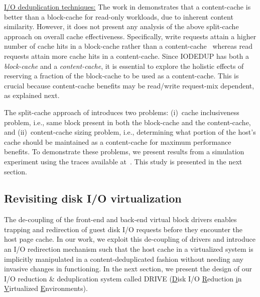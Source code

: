 \underline{I/O deduplication techniques:}
The work in \cite{iodedup} demonstrates that a 
content-cache 
is better than a block-cache for read-only workloads,
due to inherent content similarity.
However, it does not present any analysis of the above
split-cache approach on overall cache effectiveness.
Specifically,
write requests attain a higher number of cache hits in a block-cache rather
than a content-cache~\cite{iodedup} whereas read requests attain more 
cache hits in a content-cache. 
Since IODEDUP has both 
a \textit{block-cache} and a \textit{content-cache}, 
it is essential to explore the holistic effects of reserving a fraction of the
block-cache to be used as a content-cache. This is
crucial because content-cache benefits may be read/write 
request-mix dependent, as explained next.

The split-cache approach of \cite{iodedup} introduces two problems:
(i)~cache inclusiveness problem, i.e.,
same block present in both the block-cache and the content-cache, and
(ii)~content-cache sizing problem, i.e., determining what portion of 
the host's cache should be maintained as a content-cache
for maximum performance benefits.
To demonstrate these problems, we present results from a simulation experiment
using the traces %
available at~\cite{iodedup-online}. This study is presented in the next 
section.

\subsection{Revisiting disk I/O virtualization}
The de-coupling of the front-end and back-end virtual block drivers
enables trapping and redirection 
of guest disk I/O requests before they 
encounter the host page cache.
In our work, we exploit this de-coupling of drivers and introduce 
an I/O redirection mechanism such that the host cache in a virtualized
system is implicitly manipulated in a
content-deduplicated fashion without needing any invasive changes
in functioning.
In the next section, we present the design of our I/O reduction 
\& deduplication system called DRIVE (\underline{D}isk I/O 
\underline{R}eduction \underline{i}n 
\underline{V}irtualized \underline{E}nvironments).
